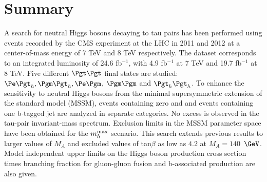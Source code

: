 \clearpage

\section{Summary}
A search for neutral Higgs bosons decaying to tau pairs has been performed using events recorded by the CMS experiment at the LHC
in 2011 and 2012 at a center-of-mass energy of 7 TeV and 8 TeV respectively. The dataset corresponds to an integrated luminosity of 24.6 fb$^{-1}$, with 4.9 fb$^{-1}$ at 7 TeV and 19.7 fb$^{-1}$ at 8 TeV. Five different $\Pgt\Pgt$ final states are studied: $\Pe\Pgt_{h}, \Pgm\Pgt_{h}, \Pe\Pgm$, $\Pgm\Pgm$ and $\Pgt_{h}\Pgt_{h}$. 
To enhance the sensitivity to neutral Higgs bosons from the minimal supersymmetric extension of the standard model (MSSM), 
events containing zero and and events containing one b-tagged jet are analyzed in separate categories.
No excess is observed in the tau-pair invariant-mass spectrum. Exclusion limits in the MSSM parameter space have been obtained for the $m_h^{\rm max}$ scenario. This search extends previous results to larger values of $M_A$ and excluded values of tan$\beta$ as low as $4.2$ at $M_A=140$~$\GeV$. 
Model independent upper limits on the Higgs boson production cross section times branching fraction for gluon-gluon fusion and b-associated production are also given.





